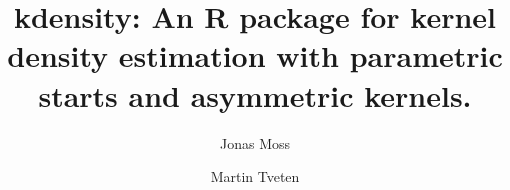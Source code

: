 \documentclass{standalone}
\begin{document}
\author
{
    Jonas Moss \and Martin Tveten
}
\title{kdensity: An R package for kernel
density estimation with parametric starts and asymmetric kernels.}
\maketitle

\end{document}
